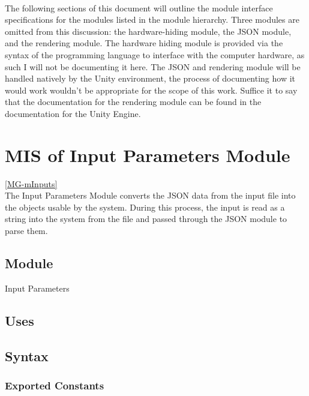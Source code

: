 \documentclass[12pt, titlepage]{article}
\begin{document}
~\newpage

The following sections of this document will outline the module interface 
specifications for the modules listed in the module hierarchy. Three modules 
are omitted from this discussion: the hardware-hiding module, the JSON module, 
and the rendering module. The hardware hiding module is provided via the syntax 
of the programming language to interface with the computer hardware, as such I 
will not be documenting it here. The JSON and rendering module will be handled 
natively by the Unity environment, the process of documenting how it would work 
wouldn't be appropriate for the scope of this work. Suffice it to say that the 
documentation for the rendering module can be found in the documentation for 
the Unity Engine.

\section{MIS of Input Parameters Module} \ref{MG-mInputs} \\
  The Input Parameters Module
converts the JSON data from the input file into the objects usable by the
system. During this process, the input is read as a string into the system from
the file and passed through the JSON module to parse them.

\subsection{Module}
Input Parameters

\subsection{Uses}

\subsection{Syntax}
\subsubsection{Exported Constants}
\end{document}
